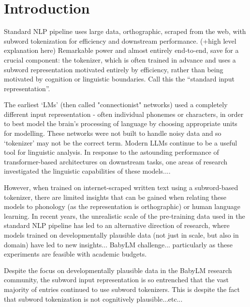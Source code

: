 \chapter{Introduction}

Standard NLP pipeline uses large data, orthographic, scraped from the web, with subword tokenization for efficiency and downstream performance. (+high level explanation here) Remarkable power and almost entirely end-to-end, save for a crucial component: the tokenizer, which is often trained in advance and uses a subword representation motivated entirely by efficiency, rather than being motivated by cognition or linguistic boundaries. Call this the ``standard input representation''.


The earliest `LMs' (then called "connectionist" networks) used a completely different input representation - often individual phonemes or characters, in order to best model the brain's processing of language by choosing appropriate units for modelling. These networks were not built to handle noisy data and so `tokenizer' may not be the correct term. Modern LLMs continue to be a useful tool for linguistic analysis. In response to the astounding performance of transformer-based architectures on downstream tasks, one areas of research investigated the linguistic capabilities of these models....

However, when trained on internet-scraped written text using a subword-based tokenizer, there are limited insights that can be gained when relating these models to phonology (as the representation is orthographic) or human language learning. In recent years, the unrealistic scale of the pre-training data used in the standard NLP pipeline has led to an alternative direction of research, where models trained on developmentally plausible data (not just in scale, but also in domain) have led to new insights... BabyLM challenge... particularly as these experiments are feasible with academic budgets.

Despite the focus on developmentally plausible data in the BabyLM research community, the subword input representation is so entrenched that the vast majority of entries continued to use subword tokenizers. This is despite the fact that subword tokenization is not cognitively plausible...etc...

